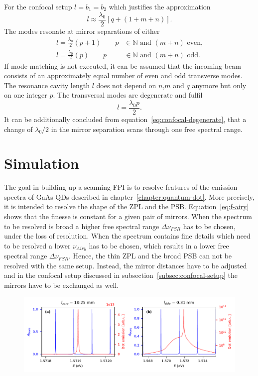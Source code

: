 For the confocal setup $l=b_1=b_2$ which justifies the approximation
\begin{equation}
l \approx \frac{\lambda_0}{2} \left[q + \left(1+m+n\right)\right].
\end{equation}
The modes resonate at mirror separations of either
\begin{align}
l = \frac{\lambda_0}{2}(p+1) \qquad p&\in\mathbb{N} \textrm{ and } (m+n) \textrm{ even,} \\
l = \frac{\lambda_0}{2}(p) \qquad p&\in\mathbb{N} \textrm{ and } (m+n) \textrm{ odd.}
\end{align}
If mode matching is not executed, it can be assumed that the incoming beam consists of an approximately equal number of even and odd transverse modes.
The resonance cavity length $l$ does not depend on $n$,$m$ and $q$ anymore but only on one integer $p$. The transversal modes are degenerate and fulfil
\begin{equation}
\label{eq:confocal-degenerate}
l = \frac{\lambda_0 p}{2}.	
\end{equation}
It can be additionally concluded from equation~\eqref{eq:confocal-degenerate}, that a change of $\lambda_0/2$ in the mirror separation scans through one free spectral range.
\section{Simulation}

The goal in building up a scanning \acl{FPI} is to resolve features of the emission spectra of \ac{GaAs} \aclp{QD} described in chapter~\ref{chapter:quantum-dot}. More precisely, it is intended to resolve the shape of the \ac{ZPL} and the \ac{PSB}.
Equation~\ref{eq:f-airy} shows that the finesse is constant for a given pair of mirrors.
When the spectrum to be resolved is broad a higher free spectral range $\Delta \nu_{FSR}$ has to be chosen, under the loss of resolution.
When the spectrum contains fine details which need to be resolved a lower $\nu_{Airy}$ has to be chosen, which results in a lower free spectral range $\Delta \nu_{FSR}$.
Hence, the thin \ac{ZPL} and the broad \ac{PSB} can not be resolved with the same setup.
Instead, the mirror distances have to be adjusted and in the confocal setup discussed in subsection~\ref{subsec:confocal-setup} the mirrors have to be exchanged as well.


\begin{figure}[H]
	\centering
	\includegraphics[width=\linewidth]{figures/fabry-perot/plots/simulation-comparison-dot-fabry-perot-modes}
	\caption{}
	\label{fig:simulation-comparison-dot-fabry-perot-modes}
\end{figure}

